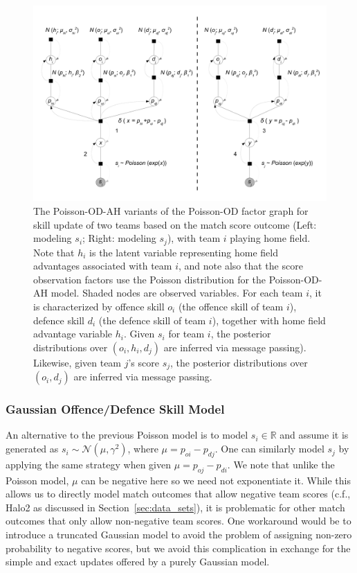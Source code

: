 \begin{figure}[t!]
\centerline{\includegraphics[scale=0.3]{modelAndInferenceHA}}
\caption{
The Poisson-OD-AH variants of the Poisson-OD factor graph for skill update of two teams based on the match score outcome (Left: modeling $s_i$; Right: modeling $s_j$), with team $i$ playing home field. Note that $h_i$ is the latent variable representing home field advantages associated with team $i$, and note also that the score observation factors use the Poisson distribution for the Poisson-OD-AH model. Shaded nodes are observed variables. For each team $i$, it is characterized by offence skill $o_{i}$ (the offence skill of team $i$), defence skill $d_{i}$ (the defence skill of
team $i$), together with home field advantage variable $h_i$. Given $s_i$ for team $i$, the posterior distributions over $(o_i, h_i, d_j)$ are inferred via message passing). Likewise, given team $j$'s score $s_j$, the posterior distributions over $(o_i,d_j)$ are inferred via message passing.
}
\label{fig:trueskill_variant_AH}
\end{figure}

\subsubsection{Gaussian Offence/Defence Skill Model}

An alternative to the previous Poisson model is to
model $s_i \in \mathbb{R}$ and assume it
is generated as $s_{i}\sim \mathcal{N}(\mu, \gamma^2)$,
where $\mu = p_{oi}-p_{dj}$.  One can similarly
model $s_j$ by applying the same strategy when given $\mu = p_{oj} -
p_{di}$.  We note that unlike the Poisson model, $\mu$ can be negative
here so we need not exponentiate it.  While this allows us to directly
model match outcomes that allow negative team scores (c.f., Halo2 as
discussed in Section~\ref{sec:data_sets}), it is problematic for other
match outcomes that only allow non-negative team scores.  One
workaround would be to introduce a truncated Gaussian model to avoid
the problem of assigning non-zero probability to negative scores, but
we avoid this complication in exchange for the simple and exact
updates offered by a purely Gaussian model.

